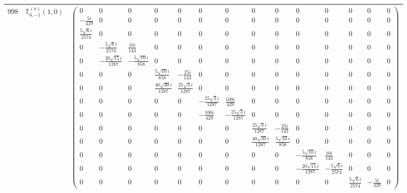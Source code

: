 \documentclass[fleqn,8pt,landscape]{jsarticle}
\begin{document}
\begin{center}
\begin{longtable}{ccc}
$ 998 $ & $ \mathbb{T}_{6,-1}^{(a)}(1,0) $ & $ \begin{pmatrix} 0 & 0 & 0 & 0 & 0 & 0 & 0 & 0 & 0 & 0 & 0 & 0 & 0 & 0 \\ - \frac{5 i}{429} & 0 & 0 & 0 & 0 & 0 & 0 & 0 & 0 & 0 & 0 & 0 & 0 & 0 \\ \frac{5 \sqrt{6} i}{2574} & 0 & 0 & 0 & 0 & 0 & 0 & 0 & 0 & 0 & 0 & 0 & 0 & 0 \\ 0 & - \frac{5 \sqrt{6} i}{2574} & \frac{10 i}{143} & 0 & 0 & 0 & 0 & 0 & 0 & 0 & 0 & 0 & 0 & 0 \\ 0 & - \frac{20 \sqrt{15} i}{1287} & - \frac{5 \sqrt{10} i}{858} & 0 & 0 & 0 & 0 & 0 & 0 & 0 & 0 & 0 & 0 & 0 \\ 0 & 0 & 0 & \frac{5 \sqrt{10} i}{858} & - \frac{25 i}{143} & 0 & 0 & 0 & 0 & 0 & 0 & 0 & 0 & 0 \\ 0 & 0 & 0 & \frac{40 \sqrt{30} i}{1287} & \frac{25 \sqrt{3} i}{1287} & 0 & 0 & 0 & 0 & 0 & 0 & 0 & 0 & 0 \\ 0 & 0 & 0 & 0 & 0 & - \frac{25 \sqrt{3} i}{1287} & \frac{100 i}{429} & 0 & 0 & 0 & 0 & 0 & 0 & 0 \\ 0 & 0 & 0 & 0 & 0 & - \frac{100 i}{429} & - \frac{25 \sqrt{3} i}{1287} & 0 & 0 & 0 & 0 & 0 & 0 & 0 \\ 0 & 0 & 0 & 0 & 0 & 0 & 0 & \frac{25 \sqrt{3} i}{1287} & - \frac{25 i}{143} & 0 & 0 & 0 & 0 & 0 \\ 0 & 0 & 0 & 0 & 0 & 0 & 0 & \frac{40 \sqrt{30} i}{1287} & \frac{5 \sqrt{10} i}{858} & 0 & 0 & 0 & 0 & 0 \\ 0 & 0 & 0 & 0 & 0 & 0 & 0 & 0 & 0 & - \frac{5 \sqrt{10} i}{858} & \frac{10 i}{143} & 0 & 0 & 0 \\ 0 & 0 & 0 & 0 & 0 & 0 & 0 & 0 & 0 & - \frac{20 \sqrt{15} i}{1287} & - \frac{5 \sqrt{6} i}{2574} & 0 & 0 & 0 \\ 0 & 0 & 0 & 0 & 0 & 0 & 0 & 0 & 0 & 0 & 0 & \frac{5 \sqrt{6} i}{2574} & - \frac{5 i}{429} & 0 \end{pmatrix} $ \\ \hline

\end{longtable}
\end{center}
\end{document}
